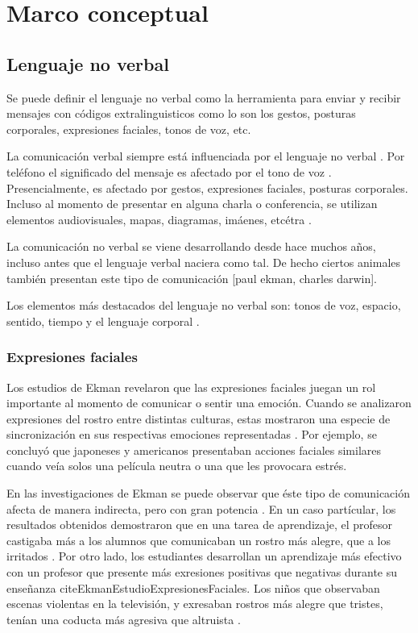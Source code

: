 \chapter{Marco conceptual}

\section{Lenguaje no verbal}

Se puede definir el lenguaje no verbal como la herramienta para enviar y recibir mensajes con c\'odigos extralinguisticos como lo son los gestos, posturas corporales, expresiones faciales, tonos de voz, etc.

La comunicaci\'on verbal siempre est\'a influenciada por el lenguaje no verbal \cite{bussinessCommunication}. Por tel\'efono el significado del mensaje es afectado por el tono de voz \cite{bussinessCommunication}. Presencialmente, es afectado por gestos, expresiones faciales, posturas corporales. Incluso al momento de presentar en alguna charla o conferencia, se utilizan elementos audiovisuales, mapas, diagramas, im\'aenes, etc\'etra \cite{bussinessCommunication}.

La comunicaci\'on no verbal se viene desarrollando desde hace muchos a\~nos, incluso antes que el lenguaje verbal naciera como tal. De hecho ciertos animales tambi\'en presentan este tipo de comunicaci\'on [paul ekman, charles darwin].

Los elementos m\'as destacados del lenguaje no verbal son: tonos de voz, espacio, sentido, tiempo y el lenguaje corporal \cite{bussinessCommunication}.



\subsection{Expresiones faciales}
Los estudios de Ekman \cite{EkmanEstudioExpresionesFaciales} revelaron que las expresiones faciales juegan un rol importante al momento de comunicar o sentir una emoci\'on. Cuando se analizaron expresiones del rostro entre distintas culturas, estas mostraron una especie de sincronizaci\'on en sus respectivas emociones representadas \cite{EkmanEstudioExpresionesFaciales}. Por ejemplo, se concluy\'o que japoneses y americanos presentaban acciones faciales similares cuando ve\'ia solos una pel\'icula neutra o una que les provocara estr\'es.

En las investigaciones de Ekman se puede observar que \'este tipo de comunicaci\'on afecta de manera indirecta, pero con gran potencia \cite{EkmanEstudioExpresionesFaciales}. En un caso part\'icular, los resultados obtenidos demostraron que en una tarea de aprendizaje, el profesor castigaba m\'as a los alumnos que comunicaban un rostro m\'as alegre, que a los irritados \cite{EkmanEstudioExpresionesFaciales}. Por otro lado, los estudiantes desarrollan un aprendizaje m\'as efectivo con un profesor que presente m\'as exresiones positivas que negativas durante su ense\~nanza cite{EkmanEstudioExpresionesFaciales}. Los ni\~nos que observaban escenas violentas en la televisi\'on, y exresaban rostros m\'as alegre que tristes, ten\'ian una coducta m\'as agresiva que altruista \cite{EkmanEstudioExpresionesFaciales}.

